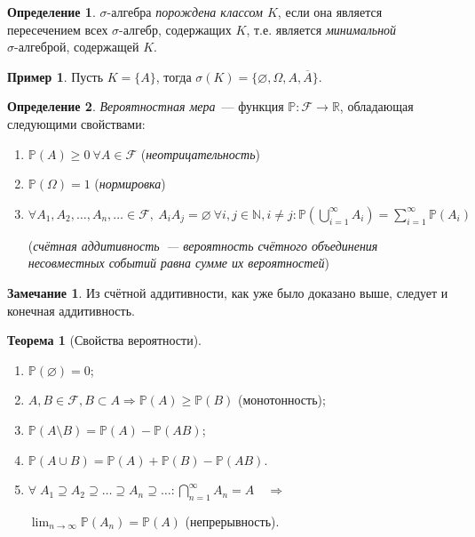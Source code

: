 \documentclass[oneside,final,14pt]{extreport}
\newcommand\myprob[1]{{\mathbb{P}(#1)}}
\theoremstyle{plain}
\theoremstyle{definition}
\newtheorem*{defn}{Определение}
\newtheorem*{exmp}{Пример}
\newtheorem*{rmrk}{Замечание}
\theoremstyle{named}
\newtheorem*{namedthm}{Теорема}
\begin{document}
\begin{defn}
    $\sigma \text{-алгебра}$ {\it порождена классом $K$}, если она является пересечением всех $\sigma \text{-алгебр}$, содержащих $K$, т.е. является {\it минимальной $\sigma \text{-алгеброй}$}, содержащей $K$.
\end{defn}

\begin{exmp}
    Пусть $K = \{A\}$, тогда $\sigma (K) = \{\varnothing, \Omega, A, \overline{A}\}$.
\end{exmp}

\begin{defn}
    {\it Вероятностная мера}~--- функция $\mathbb{P}: \mathcal{F} \rightarrow \mathbb{R}$, обладающая следующими свойствами:

\begin{enumerate}
    \item $\myprob{A} \geqslant 0~\forall A \in \mathcal{F}$ ({\it неотрицательность})
    \item $\myprob{\Omega} = 1$ ({\it нормировка})
    \item $\forall A_1, A_2, \ldots, A_n, \ldots \in \mathcal{F},~ A_{i}A_{j} = \varnothing~ \forall i, j \in \mathbb{N}, i \ne j \colon \myprob{\bigcup\limits_{i=1}^\infty A_i} = \sum\limits_{i=1}^\infty \myprob{A_i}$
    
    ({\it счётная аддитивность~--- вероятность счётного объединения несовместных событий равна сумме их вероятностей})
\end{enumerate}
\end{defn}

\begin{rmrk}
    Из счётной аддитивности, как уже было доказано выше, следует и конечная аддитивность.
\end{rmrk}

\begin{namedthm}[Свойства вероятности]\leavevmode
    \begin{enumerate}
       \item $\myprob{\varnothing}=0$;
        \item $A, B \in \mathcal{F}, B \subset A \Rightarrow \myprob{A} \geqslant \myprob{B}$ (монотонность);
       \item $\myprob{A \setminus B} = \myprob{A} - \myprob{AB}$;
       \item $\myprob{A \cup B} = \myprob{A} + \myprob{B} - \myprob{AB}$.
       \item $ \forall \; A_1 \supseteq A_2 \supseteq \ldots \supseteq A_n \supseteq \ldots \colon \bigcap\limits_{n = 1}^{\infty} A_n = A \quad \Rightarrow$
       
       $\displaystyle \lim_{n \to \infty}\myprob{A_n} = \myprob{A}$ (непрерывность).
    \end{enumerate}
\end{namedthm}
\end{document}
